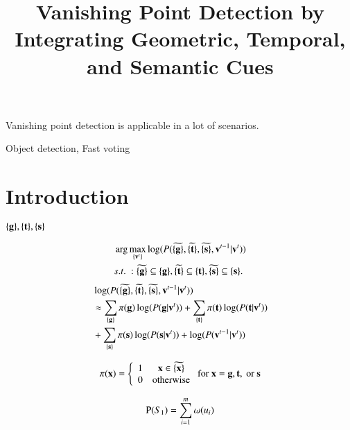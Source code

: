 \documentclass[paper]{ieice}
\title{Vanishing Point Detection by Integrating Geometric, Temporal, and Semantic Cues}
\begin{document}
\maketitle
\begin{summary}
Vanishing point detection is applicable in a lot of scenarios.
\end{summary}
\begin{keywords}
Object detection, Fast voting
\end{keywords}

\section{Introduction}


$\{\bf g\},\{\bf t\},\{\bf s\}$

\[
\begin{aligned}
&\arg\max  \limits_{\{{\bf v}^t\}} \log(P(\widetilde{\{\bf g\}},\widetilde{\{\bf t\}},\widetilde{\{\bf s\}},{\bf v}^{t-1}|{\bf v}^t) )\\
&s.t.\ :\widetilde{\{\bf g\}} \subseteq \{\bf g\},\widetilde{\{\bf t\}} \subseteq \{\bf t\}, \widetilde{\{\bf s\}} \subseteq \{\bf s\}.\\
\end{aligned}
\]
\[
\begin{aligned}
&\log(P(\widetilde{\{\bf g\}},\widetilde{\{\bf t\}},\widetilde{\{\bf s\}},{\bf v}^{t-1}|{\bf v}^t))\\
&\approx \sum_{\{\bf g\}}{\pi({\bf g})\log(P({\bf g}|{\bf v}^t))}+\sum_{\{\bf t\}}{\pi({\bf t})\log(P({\bf t}|{\bf v}^t))}\\&+\sum_{\{\bf s\}}{\pi({\bf s})\log(P({\bf s}|{\bf v}^t))}+\log(P({\bf v}^{t-1}|{\bf v}^t))\\
\end{aligned}
\]




\[
\pi({\bf x})
= \left\{ \begin{array}{*{20}{c}}
   1   &{\bf x} \in \widetilde{\{{\bf x}\}} \\
   0 &\mbox{otherwise}
\end{array} \right. \mbox{for } {\bf x} = {\bf g},{\bf t},\mbox{ or }{\bf s}
\]

\[
{\rm P}(S_1)=\sum_{i=1}^m {\omega({u_i})}
\]





\end{document}
